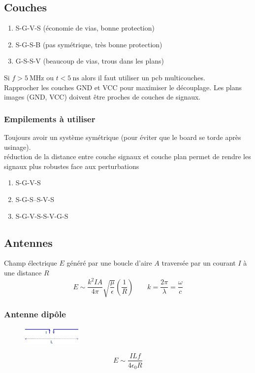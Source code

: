 \documentclass[resume]{subfiles}
\begin{document}
\begin{multicols}{3}
\subsection{Couches}
\begin{enumerate}
\item S-G-V-S (économie de vias, bonne protection)
\item S-G-S-B (pas symétrique, très bonne protection)
\item G-S-S-V (beaucoup de vias, trous dans les plans)
\end{enumerate}
Si $f>\SI{5}{\mega\hertz}$ ou $t<\SI{5}{\nano\second}$ alors il faut utiliser un pcb multicouches.\\
Rapprocher les couches GND et VCC pour maximiser le découplage. Les plans images (GND, VCC) doivent être proches de couches de signaux.
\subsubsection{Empilements à utiliser}
Toujours avoir un système symétrique (pour éviter que le board se torde après usinage).\\
réduction de la distance entre couche signaux et couche plan permet de rendre les signaux plus robustes face aux perturbations
\begin{enumerate}
\item S-G-V-S
\item S-G-S--S-V-S
\item S-G-V-S-S-V-G-S
\end{enumerate}
\subsection{Antennes}
Champ électrique $E$ généré par une boucle d'aire $A$ traversée par un courant $I$ à une distance $R$
$$E\sim \frac{k^2 IA}{4\pi}\sqrt{\frac{\mu}{\epsilon}}\left(\frac{1}{R}\right)\qquad k=\frac{2\pi}{\lambda}=\frac{\omega}{c}$$
\subsubsection{Antenne dipôle}
\begin{figure}[H]
\centering
\includegraphics[width=3.00cm]{img_5.png}
\end{figure}
$$E\sim \frac{ILf}{4\epsilon_0 R}$$

\end{multicols}
\end{document}
